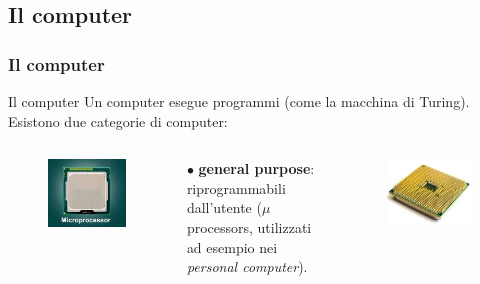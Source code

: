 \subsection[Il computer]{Il computer}
\begin{frame}
	\frametitle{Il computer}
	
	\begin{block}{Il computer}
		Un computer esegue programmi (come la macchina di Turing).\\
		Esistono due categorie di computer:
		\begin{columns}			
			\begin{figure}[!htbp]
				\centering 
				\includegraphics[width=0.7\linewidth]{images/2_le_architetture/microprocessor.jpeg}
			\end{figure}
			
			$\bullet$ \textbf{general purpose}:\\riprogrammabili dall'utente ($\mu$processors, utilizzati ad esempio nei \textit{personal computer}).
			
			\begin{figure}[!htbp]
				\centering
				\advance\leftskip-0.5cm
				\includegraphics[width=1.0\linewidth]{images/2_le_architetture/microprocessor.png}
			\end{figure}
			

\end{columns}
\end{block}
\end{frame}
